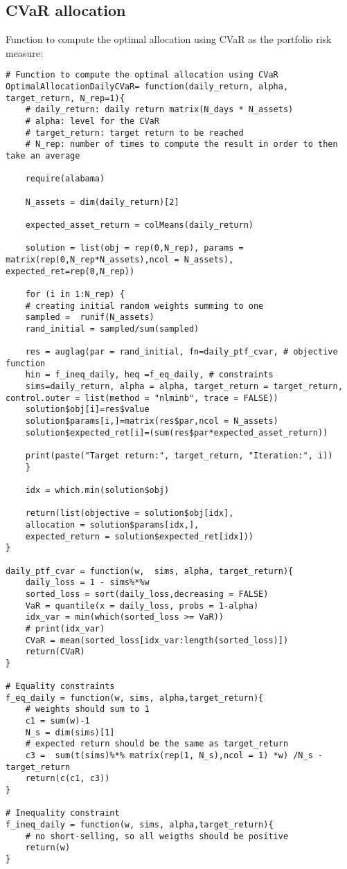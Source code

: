 \subsection{CVaR allocation}

Function to compute the optimal allocation using CVaR as the portfolio risk measure:

\begin{lstlisting}
# Function to compute the optimal allocation using CVaR
OptimalAllocationDailyCVaR= function(daily_return, alpha, target_return, N_rep=1){
	# daily_return: daily return matrix(N_days * N_assets)
	# alpha: level for the CVaR
	# target_return: target return to be reached
	# N_rep: number of times to compute the result in order to then take an average
	
	require(alabama)
	
	N_assets = dim(daily_return)[2]
	
	expected_asset_return = colMeans(daily_return)
	
	solution = list(obj = rep(0,N_rep), params = matrix(rep(0,N_rep*N_assets),ncol = N_assets), expected_ret=rep(0,N_rep))
	
	for (i in 1:N_rep) {
	# creating initial random weights summing to one
	sampled =  runif(N_assets)
	rand_initial = sampled/sum(sampled)
	
	res = auglag(par = rand_initial, fn=daily_ptf_cvar, # objective function
	hin = f_ineq_daily, heq =f_eq_daily, # constraints
	sims=daily_return, alpha = alpha, target_return = target_return, control.outer = list(method = "nlminb", trace = FALSE))
	solution$obj[i]=res$value
	solution$params[i,]=matrix(res$par,ncol = N_assets)
	solution$expected_ret[i]=(sum(res$par*expected_asset_return))
	
	print(paste("Target return:", target_return, "Iteration:", i))
	}
	
	idx = which.min(solution$obj)
	
	return(list(objective = solution$obj[idx], 
	allocation = solution$params[idx,],
	expected_return = solution$expected_ret[idx]))
}

daily_ptf_cvar = function(w,  sims, alpha, target_return){
	daily_loss = 1 - sims%*%w
	sorted_loss = sort(daily_loss,decreasing = FALSE)
	VaR = quantile(x = daily_loss, probs = 1-alpha)
	idx_var = min(which(sorted_loss >= VaR))
	# print(idx_var)
	CVaR = mean(sorted_loss[idx_var:length(sorted_loss)])
	return(CVaR)
}

# Equality constraints
f_eq_daily = function(w, sims, alpha,target_return){
	# weights should sum to 1
	c1 = sum(w)-1 
	N_s = dim(sims)[1]
	# expected return should be the same as target_return
	c3 =  sum(t(sims)%*% matrix(rep(1, N_s),ncol = 1) *w) /N_s - target_return
	return(c(c1, c3))
}

# Inequality constraint
f_ineq_daily = function(w, sims, alpha,target_return){
	# no short-selling, so all weigths should be positive
	return(w)
}
\end{lstlisting}

